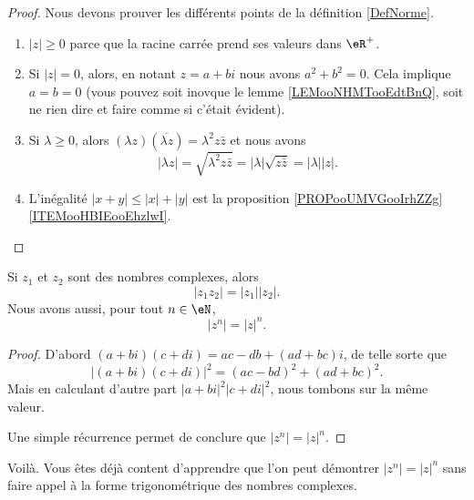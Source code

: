 \begin{proof}
	Nous devons prouver les différents points de la définition \ref{DefNorme}.
	\begin{enumerate}
		\item
		      \( | z |\geq 0\) parce que la racine carrée prend ses valeurs dans \( \eR^+\).
		\item
		      Si \( | z |=0\), alors, en notant \( z=a+bi\) nous avons \( a^2+b^2=0\). Cela implique \( a=b=0\) (vous pouvez soit inovque le lemme \ref{LEMooNHMTooEdtBnQ}, soit ne rien dire et faire comme si c'était évident).
		\item
		      Si \( \lambda\geq 0\), alors \( (\lambda z)(\overline{ \lambda z })=\lambda^2z\bar z\) et nous avons
		      \begin{equation}
			      | \lambda z |=\sqrt{ \lambda^2z\bar z }=| \lambda |\sqrt{ z\bar z }=| \lambda | |z |.
		      \end{equation}
		\item
		      L'inégalité \( | x+y |\leq | x |+| y |\) est la proposition \ref{PROPooUMVGooIrhZZg}\ref{ITEMooHBIEooEhzlwI}.
	\end{enumerate}
\end{proof}


\begin{proposition} \label{PROPooXLARooYSDCsF}
	Si \( z_1\) et \( z_2\) sont des nombres complexes, alors
	\begin{equation}
		| z_1z_2 |=| z_1 | |z_2 |.
	\end{equation}
	Nous avons aussi, pour tout \( n\in \eN\),
	\begin{equation}       \label{EQooATTQooRpJeCo}
		| z^n |=| z |^n.
	\end{equation}
\end{proposition}

\begin{proof}
	D'abord \( (a+bi)(c+di)=ac-db+(ad+bc)i\), de telle sorte que
	\begin{equation}
		| (a+bi)(c+di) |^2=(ac-bd)^2+(ad+bc)^2.
	\end{equation}
	Mais en calculant d'autre part \( | a+bi |^2| c+di |^2\), nous tombons sur la même valeur.

	Une simple récurrence permet de conclure que \( | z^n |=| z |^n\).
\end{proof}
Voilà. Vous êtes déjà content d'apprendre que l'on peut démontrer \( | z^n |=| z |^n\) sans faire appel à la forme trigonométrique des nombres complexes.

